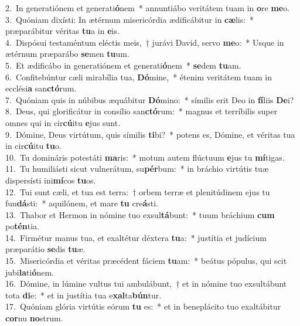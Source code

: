 {2.~}In generatiónem et generati\textbf{ó}nem~* annuntiábo veritátem tuam in \textbf{o}re \textbf{me}o.\\
{3.~}Quóniam dixísti: In ætérnum misericórdia ædificábitur in \textbf{cæ}lis:~* præparábitur véritas \textbf{tu}a in \textbf{e}is.\\
{4.~}Dispósui testaméntum eléctis meis,~† jurávi David, servo \textbf{me}o:~* Usque in ætérnum præparábo \textbf{se}men \textbf{tu}um.\\
{5.~}Et ædificábo in generatiónem et generati\textbf{ó}nem~* \textbf{se}dem \textbf{tu}am.\\
{6.~}Confitebúntur cæli mirabília tua, \textbf{Dó}mine,~* étenim veritátem tuam in ecclési\textbf{a} san\textbf{ctó}rum.\\
{7.~}Quóniam quis in núbibus æquábitur \textbf{Dó}mino:~* símilis erit Deo in \textbf{fí}liis \textbf{De}i?\\
{8.~}Deus, qui glorificátur in consílio san\textbf{ctó}rum:~* magnus et terríbilis super omnes qui in cir\textbf{cú}itu \textbf{e}jus sunt.\\
{9.~}Dómine, Deus virtútum, quis símilis \textbf{ti}bi?~* potens es, Dómine, et véritas tua in cir\textbf{cú}itu \textbf{tu}o.\\
{10.~}Tu domináris potestáti \textbf{ma}ris:~* motum autem flúctuum \textbf{e}jus tu \textbf{mí}tigas.\\
{11.~}Tu humiliásti sicut vulnerátum, su\textbf{pér}bum:~* in bráchio virtútis tuæ dispersísti ini\textbf{mí}cos \textbf{tu}os.\\
{12.~}Tui sunt cæli, et tua est terra:~† orbem terræ et plenitúdinem ejus tu fun\textbf{dá}sti:~* aquilónem, et mare \textbf{tu} cre\textbf{á}sti.\\
{13.~}Thabor et Hermon in nómine tuo exsul\textbf{tá}bunt:~* tuum bráchium \textbf{cum} po\textbf{tén}tia.\\
{14.~}Firmétur manus tua, et exaltétur déxtera \textbf{tu}a:~* justítia et judícium præparátio \textbf{se}dis \textbf{tu}æ.\\
{15.~}Misericórdia et véritas præcédent fáciem \textbf{tu}am:~* beátus pópulus, qui scit jubi\textbf{la}ti\textbf{ó}nem.\\
{16.~}Dómine, in lúmine vultus tui ambulábunt,~† et in nómine tuo exsultábunt tota \textbf{di}e:~* et in justítia tua e\textbf{xal}ta\textbf{bún}tur.\\
{17.~}Quóniam glória virtútis eórum \textbf{tu} es:~* et in beneplácito tuo exaltábitur \textbf{cor}nu \textbf{no}strum.\\
